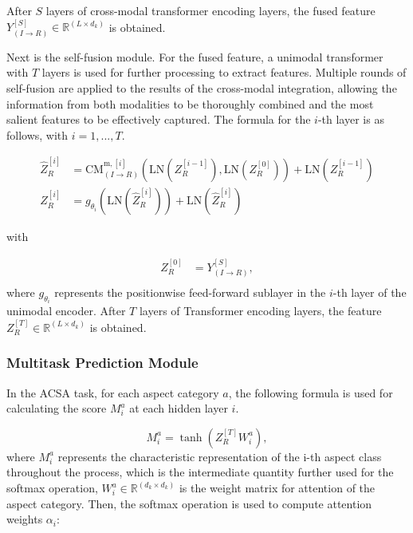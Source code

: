 \documentclass[preprint,12pt]{elsarticle}
\begin{document}
After $S$ layers of cross-modal transformer encoding layers, the fused feature \(Y_{(I \to R)}^{[S]} \in \mathbb{R}^{(L \times d_k)}\) is obtained.

Next is the self-fusion module. For the fused feature, a unimodal transformer with $T$ layers is used for further processing to extract features. Multiple rounds of self-fusion are applied to the results of the cross-modal integration, allowing the information from both modalities to be thoroughly combined and the most salient features to be effectively captured. The formula for the $i$-th layer is as follows, with $i=1,...,T$.

\begin{equation}
\begin{aligned}
\hat{Z}_R^{[i]} & = \text{CM}_{(I \to R)}^{\text{m},[i]}\left(\text{LN}(Z_R^{[i-1]}), \text{LN}(Z_R^{[0]})\right) + \text{LN}(Z_R^{[i-1]}) \\
Z_R^{[i]} & = g_{\theta_i}\left(\text{LN}(\hat{Z}_R^{[i]})\right) + \text{LN}(\hat{Z}_R^{[i]})
\end{aligned}
\end{equation}

with 

\begin{equation}
\begin{aligned}
Z_R^{[0]} & = Y_{(I \to R)}^{[S]}, \\
\end{aligned}
\end{equation}
where $g_{\theta_i}$ represents the positionwise feed-forward sublayer in the $i$-th layer of the unimodal encoder. After $T$ layers of Transformer encoding layers, the feature \(Z_R^{[T]} \in \mathbb{R}^{(L \times d_k)}\) is obtained.


\subsubsection{Multitask Prediction Module}

In the ACSA task, for each aspect category $a$, the following formula is used for calculating the score $M_i^a$ at each hidden layer $i$.

\begin{equation}
M_i^a = \tanh\left(Z_R^{[T]} W_i^a\right),
\end{equation}
where \(M_i^a\) represents the characteristic representation of the i-th aspect class throughout the process, which is the intermediate quantity further used for the softmax operation, $W_i^a \in \mathbb{R}^{(d_k \times d_k)}$ is the weight matrix for attention of the aspect category. Then, the softmax operation is used to compute attention weights $\alpha_i$:
\end{document}
